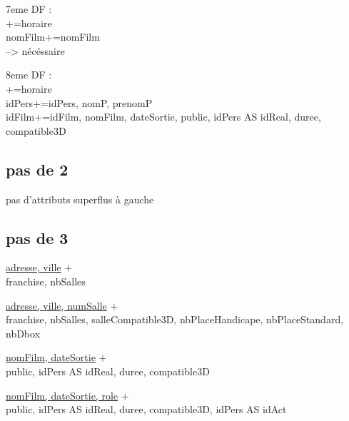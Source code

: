 \documentclass[a4paper,sffamily,12pt]{article}
\begin{document}
\vspace{1cm}

\noindent7eme DF : \\

+={horaire} \\
{nomFilm}+={nomFilm} \\
--> nécéssaire
\vspace{1cm}

\noindent8eme DF : \\

+={horaire} \\
{idPers}+={idPers, nomP, prenomP} \\
{idFilm}+={idFilm, nomFilm, dateSortie, public, idPers AS idReal, duree, compatible3D} \\

\vspace{1cm}

\subsection{pas de 2}

pas d'attributs superflus à gauche

\vspace{1cm}

\subsection{pas de 3}

\vspace{1cm}

\underline{adresse, ville} $+$ \\
franchise, nbSalles\\

\vspace{1cm}

\underline{adresse, ville, numSalle} $+$ \\
franchise, nbSalles, salleCompatible3D, nbPlaceHandicape, nbPlaceStandard, nbDbox\\

\vspace{1cm}

\underline{nomFilm, dateSortie} $+$ \\
public, idPers AS idReal, duree, compatible3D\\

\vspace{1cm}

\underline{nomFilm, dateSortie, role} $+$ \\
public, idPers AS idReal, duree, compatible3D, idPers AS idAct\\
\end{document}
